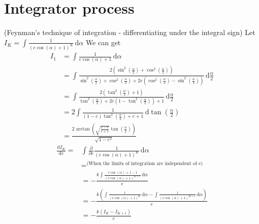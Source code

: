 \documentclass[11pt,en]{elegantpaper}
\begin{document}
\section{Integrator process}
 (Feynman's technique of integration - differentiating under the integral sign)
Let $I_K=\int \frac{1}{(e \cos (\alpha )+1)^K} \, \mathrm{d}\alpha$
We can get \begin{align*}
	I_1 & =\int \frac{1}{e \cos (\alpha )+1} \, \mathrm{d}\alpha                                                                                                                                                                                                                                                           \\
	    & =\int \frac{2 \left(\sin ^2\left(\frac{\alpha }{2}\right)+\cos ^2\left(\frac{\alpha }{2}\right)\right)}{\sin ^2\left(\frac{\alpha }{2}\right)+\cos ^2\left(\frac{\alpha }{2}\right)+2 e \left(\cos ^2\left(\frac{\alpha }{2}\right)-\sin ^2\left(\frac{\alpha }{2}\right)\right)} \, \mathrm{d}\frac{\alpha }{2} \\
	    & =\int \frac{2 \left(\tan ^2\left(\frac{\alpha }{2}\right)+1\right)}{\tan ^2\left(\frac{\alpha }{2}\right)+2 e \left(1-\tan ^2\left(\frac{\alpha }{2}\right)\right)+1} \, \mathrm{d}\frac{\alpha }{2}                                                                                                             \\
	    & =2 \int \frac{1}{(1-e) \tan ^2\left(\frac{\alpha }{2}\right)+e+1} \, \mathrm{d}\tan \left(\frac{\alpha }{2}\right)                                                                                                                                                                                               \\
	    & =\frac{2 \arctan\left(\sqrt{\frac{1-e}{e+1}} \tan \left(\frac{\alpha }{2}\right)\right)}{\sqrt{1-e^2}}
\end{align*}
\begin{align*}
	\frac{\mathrm{d}I_K}{\mathrm{d}e}= & \int \frac{\partial }{\partial e}\frac{1}{(e \cos (\alpha )+1)^K} \, \mathrm{d}\alpha                                                       \\
	                 & =^{\text{(When the limits of integration are independent of e)}}                                                                   \\
	                 & =-\frac{k \int \frac{e \cos (\alpha )+1-1}{(e \cos (\alpha )+1)^{K+1}} \, \mathrm{d}\alpha }{e}                                             \\
	                 & =-\frac{k \left(\int \frac{1}{(e \cos (\alpha )+1)^K} \, \mathrm{d}\alpha -\int \frac{1}{(e \cos (\alpha )+1)^{K+1}} \, \mathrm{d}\alpha \right)}{e} \\
	                 & =-\frac{k \left(I_K-I_{K+1}\right)}{e}
\end{align*}
\end{document}
